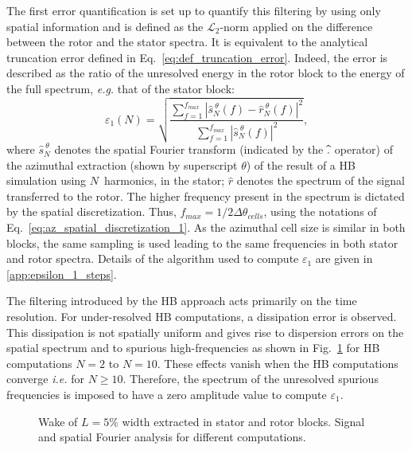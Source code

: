 The first error quantification is set up to quantify this filtering 
by using only spatial information and is defined as the $\mathcal{L}_2$-norm 
applied on the 
difference between the rotor and the stator spectra.
It is equivalent to the analytical truncation error 
defined in Eq.~\eqref{eq:def_truncation_error}. 
Indeed, the error is described as the ratio of the unresolved energy 
in the rotor block
to the energy of the full spectrum, 
\emph{e.g.} that of the stator block:
\begin{equation}
    \varepsilon_1(N) = \sqrt{
    \frac{\sum_{f=1}^{f_{max}} | \widehat{s}^{~\theta}_N (f) - 
      \widehat{r}^{~\theta}_N (f)|^2}{ 
    \sum_{f=1}^{f_{max}} | \widehat{s}^{~\theta}_N (f)|^2}},
    \label{eq:def_crit_1}
\end{equation} 
where $\widehat{s}^{~\theta}_N$ denotes the spatial Fourier transform (indicated by
the $\widehat{\vphantom{s}.}$ operator) of the azimuthal extraction (shown
by superscript $\theta$) of the result of a HB simulation using $N$~harmonics,
in the stator; $\widehat{r}$ denotes the spectrum of 
the signal transferred to the rotor.
The higher frequency present in the spectrum is dictated 
by the spatial discretization. Thus, $f_{max} = 1 / 2\Delta \theta_{cells}$, 
using the notations of Eq.~\eqref{eq:az_spatial_discretization_1}.
As the azimuthal cell size is similar in both blocks, 
the same sampling is used leading to the same 
frequencies in both stator and rotor spectra.
Details of the algorithm used to compute $\varepsilon_1$ 
are given in \ref{app:epsilon_1_steps}.

The filtering introduced by the HB approach 
acts primarily on the time resolution. 
For under-resolved HB computations, a dissipation error is observed.
This dissipation is not spatially uniform and gives rise to
dispersion errors on the spatial spectrum and to spurious
high-frequencies as shown in 
Fig.~\ref{fig:spatial_crit} for HB computations $N=2$ to $N=10$.
These effects vanish when the HB computations converge
\emph{i.e.} for $N \geq 10$.
Therefore, the spectrum of the unresolved spurious frequencies 
is imposed to have a zero amplitude value to compute
$\varepsilon_1$.
\begin{figure}[htp]
  \centering
  \caption{Wake of $L=5\%$ width extracted in stator and rotor 
  blocks. Signal and spatial Fourier analysis for different computations.}
  \label{fig:spatial_crit}
\end{figure}

